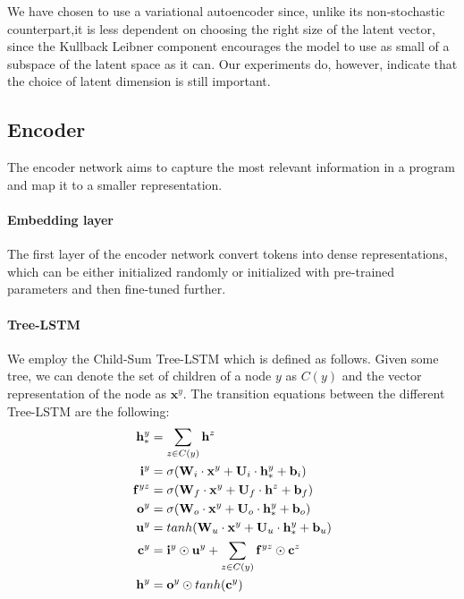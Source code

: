 
We have chosen to use a variational autoencoder \cite{kingma2013auto} since, unlike its non-stochastic counterpart,it is less dependent on choosing the right size of the latent vector, since the Kullback Leibner component encourages the model to use as small of a subspace of the latent space as it can.
Our experiments do, however, indicate that the choice of latent dimension is still important.

\subsection{Encoder}
The encoder network aims to capture the most relevant information in a program and map it to a smaller representation. 



\paragraph{Embedding layer} The first layer of the encoder network convert tokens into dense representations, which can be either initialized randomly or initialized with pre-trained parameters and then fine-tuned further.


\paragraph{Tree-LSTM} We employ the Child-Sum Tree-LSTM \cite{tai2015improved} which is defined as follows. Given some tree, we can denote the set of children of a node $y$ as $C(y)$ and the vector representation of the node as $\mathbf{x}^y$. The transition equations between the different Tree-LSTM are the following:
% 
\begin{align}\label{eq:tree_lstm_encoder}
    \mathbf{h}^y_* &= \sum_{z \in C(y)} \mathbf{h}^z \\
    \mathbf{i}^y &= \sigma(\mathbf{W}_{i} \cdot \mathbf{x}^y + \mathbf{U}_{i} \cdot \mathbf{h}^y_* + \mathbf{b}_{i})  \\ 
    \mathbf{f}^{yz} &= \sigma(\mathbf{W}_{f} \cdot \mathbf{x}^y + \mathbf{U}_{f} \cdot \mathbf{h}^z + \mathbf{b}_{f}) \\\label{eq:child_sum_4}
    \mathbf{o}^y &= \sigma(\mathbf{W}_{o} \cdot \mathbf{x}^y + \mathbf{U}_{o} \cdot \mathbf{h}^y_* + \mathbf{b}_{o}) \\
    \mathbf{u}^y &= tanh(\mathbf{W}_{u} \cdot \mathbf{x}^y + \mathbf{U}_{u} \cdot \mathbf{h}^y_* + \mathbf{b}_{u}) \\
    \mathbf{c}^y &= \mathbf{i}^y \odot \mathbf{u}^y + \sum_{z \in C(y)} \mathbf{f}^{yz} \odot \mathbf{c}^z \\
    \mathbf{h}^y &= \mathbf{o}^y \odot tanh(\mathbf{c}^y)
\end{align}

